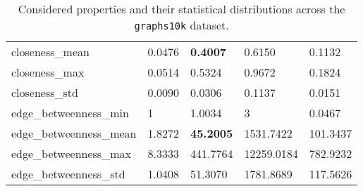 \documentclass[runningheads]{llncs}
\begin{document}
\begin{table}[htb]
\begin{tabular}{|l|l|l|l|l|}
		closeness\_mean & 0.0476 & \textbf{0.4007} & 0.6150 & 0.1132 \\
		closeness\_max & 0.0514 & 0.5324 & 0.9672 & 0.1824 \\
		closeness\_std & 0.0090 & 0.0306 & 0.1137 & 0.0151 \\
		\hline
		edge\_betweenness\_min & 1 & 1.0034 & 3 & 0.0467 \\
		edge\_betweenness\_mean & 1.8272 & \textbf{45.2005} & 1531.7422 & 101.3437 \\
		edge\_betweenness\_max & 8.3333 & 441.7764 & 12259.0184 & 782.9232 \\
		edge\_betweenness\_std & 1.0408 & 51.3070 & 1781.8689 & 117.5626 \\
		\hline
	\end{tabular}
	\caption{Considered properties and their statistical distributions across the \texttt{graphs10k} dataset.}
	\label{tbl:property-statistics}
\end{table}
\end{document}
